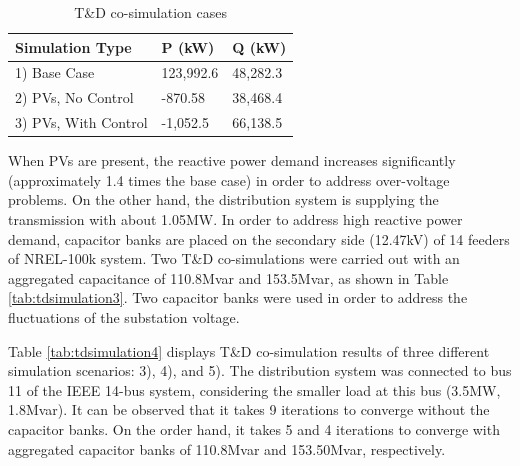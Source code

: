 \documentclass{article}
\begin{document}
\begin{table}[h]
\caption{T\&D co-simulation cases}
\centering
\begin{tabular}{|l|l|l|}
\hline
Simulation Type      & P (kW)    & Q (kW)   \\ \hline
1) Base Case         & 123,992.6 & 48,282.3 \\ \hline
2) PVs, No Control   & -870.58   & 38,468.4 \\ \hline
3) PVs, With Control & -1,052.5  & 66,138.5 \\ \hline
\end{tabular}
\label{tab:tdsimulation2}
\end{table}\par

When PVs are present, the reactive power demand increases significantly (approximately 1.4 times the base case) in order to address over-voltage problems. On the other hand, the distribution system is supplying the transmission with about 1.05MW. In order to address high reactive power demand, capacitor banks are placed on the secondary side (12.47kV) of 14 feeders of NREL-100k system. Two T\&D co-simulations were carried out with an aggregated capacitance of 110.8Mvar and 153.5Mvar, as shown in Table \ref{tab:tdsimulation3}. Two capacitor banks were used in order to address the fluctuations of the substation voltage.\par

\begin{table}[h]
\caption{T\&D co-simulation cases with capacitor banks}
\centering
{}
\label{tab:tdsimulation3}
\end{table}\par

Table \ref{tab:tdsimulation4} displays T\&D co-simulation results of three different simulation scenarios: 3), 4), and 5). The distribution system was connected to bus 11 of the IEEE 14-bus system, considering the smaller load at this bus (3.5MW, 1.8Mvar). It can be observed that it takes 9 iterations to converge without the capacitor banks. On the order hand, it takes 5 and 4 iterations to converge with aggregated capacitor banks of 110.8Mvar and 153.50Mvar, respectively.\par
\end{document}
